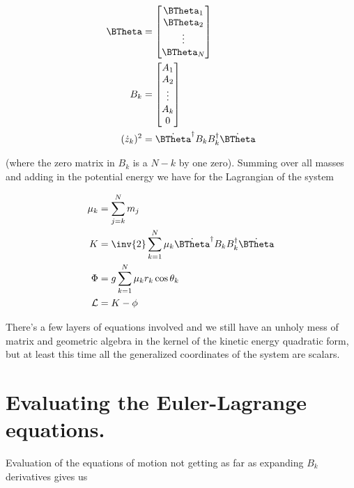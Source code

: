 \begin{align}\label{eqn:multiPendulumSpherical2:boo4}
\BTheta &=
\begin{bmatrix}
\BTheta_1 \\
\BTheta_2 \\
\vdots \\
\BTheta_N \\
\end{bmatrix} \\
B_k &=
\begin{bmatrix}
A_1 \\
A_2 \\
\vdots \\
A_k \\
0 \\
\end{bmatrix} \\
(\dot{z}_k)^2 &=
\dot{\BTheta}^\dagger B_k B_k^\dagger \dot{\BTheta}
\end{align}

(where the zero matrix in $B_k$ is a $N-k$ by one zero).  Summing over all masses and adding in the potential energy we have for the Lagrangian of the system


\begin{align}\label{eqn:multiPendulumSpherical2:boo5}
\mu_k &= \sum_{j=k}^N m_j \\
K &= 
\inv{2} \sum_{k=1}^N \mu_k
\dot{\BTheta}^\dagger 
B_k B_k^\dagger 
\dot{\BTheta} \\
\Phi &=
g \sum_{k=1}^N \mu_k r_k \cos\theta_k \\
\LL &= K - \phi
\end{align} 

There's a few layers of equations involved and we still have an unholy mess of matrix and geometric algebra in the kernel of the kinetic energy quadratic form, but at least this time all the generalized coordinates of the system are scalars.

\section{Evaluating the Euler-Lagrange equations.}

Evaluation of the equations of motion not getting as far as expanding $B_k$ derivatives gives us

